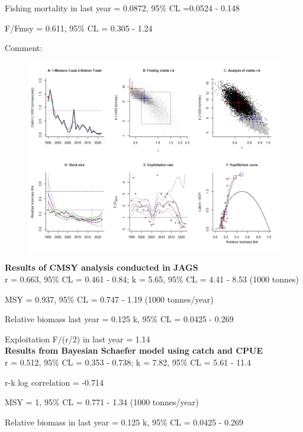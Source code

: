 \documentclass[12pt,a4paper]{article}\usepackage[]{graphicx}\usepackage[]{xcolor}
\begin{document}
Fishing mortality in last year = 0.0872, 95\% CL =0.0524 - 0.148

F/Fmsy  = 0.611, 95\% CL = 0.305 - 1.24 

 Comment:  

    \pagebreak

    \begin{figure}[ht]
    \centering
    \includegraphics[width=1.00\textwidth ext=.jpg type=jpg]{1-Western Coast 2-Bottom Trawl_AN.jpg}
    \end{figure}

    \textbf{Results of CMSY analysis conducted in JAGS}\\

r = 0.663, 95\% CL = 0.461 - 0.84; k = 5.65, 95\% CL = 4.41 - 8.53 (1000 tonnes)

MSY = 0.937, 95\% CL = 0.747 - 1.19 (1000 tonnes/year)

Relative biomass last year = 0.125 k, 95\% CL = 0.0425 - 0.269

Exploitation F/(r/2) in last year = 1.14 \\

\textbf{Results from Bayesian Schaefer model using catch and CPUE}\\

r = 0.512, 95\% CL = 0.353 - 0.738; k = 7.82, 95\% CL = 5.61 - 11.4

r-k log correlation = -0.714

MSY = 1, 95\% CL = 0.771 - 1.34 (1000 tonnes/year)

Relative biomass in last year = 0.125 k, 95\% CL = 0.0425 - 0.269
\end{document}
